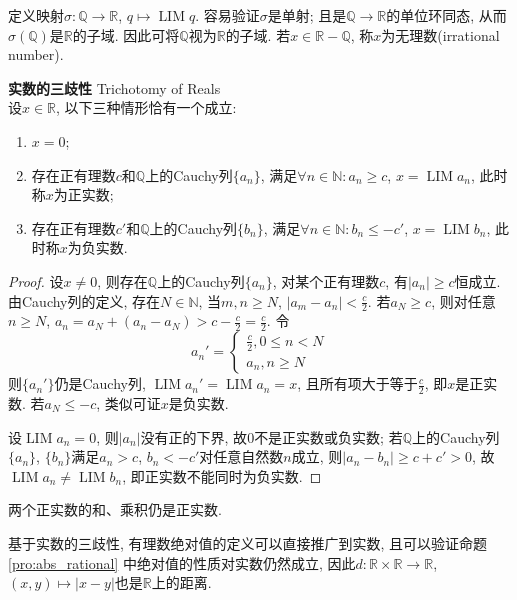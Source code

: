 \par 定义映射$\sigma: \mathbb{Q} \to \mathbb{R}$, $q\mapsto \operatorname{LIM}q$. 容易验证$\sigma$是单射; 且是$\mathbb{Q} \to \mathbb{R}$的单位环同态, 从而$\sigma(\mathbb{Q})$是$\mathbb{R}$的子域. 因此可将$\mathbb{Q}$视为$\mathbb{R}$的子域. 若$x\in \mathbb{R}-\mathbb{Q}$, 称$x$为无理数(irrational number). 

\begin{pro}\textbf{实数的三歧性} Trichotomy of Reals\\
设$x\in \mathbb{R}$, 以下三种情形恰有一个成立:
\begin{enumerate}
    \item $x=0$;
    \item 存在正有理数$c$和$\mathbb{Q}$上的Cauchy列$\{a_n\}$, 满足$\forall n\in \mathbb{N}: a_n\ge c$, $x=\operatorname{LIM} a_n$, 此时称$x$为正实数;
    \item 存在正有理数$c'$和$\mathbb{Q}$上的Cauchy列$\{b_n\}$, 满足$\forall n\in \mathbb{N}: b_n\le -c'$, $x=\operatorname{LIM} b_n$, 此时称$x$为负实数.
\end{enumerate}
\end{pro}
\begin{proof}
设$x\neq 0$, 则存在$\mathbb{Q}$上的Cauchy列$\{a_n\}$, 对某个正有理数$c$, 有$|a_n|\ge c$恒成立. 由Cauchy列的定义, 存在$N\in \mathbb{N}$, 当$m,n\ge N$, $|a_m-a_n|<\frac{c}{2}$. 若$a_N\ge c$, 则对任意$n\ge N$, $a_n = a_N +(a_n-a_N) > c - \frac{c}{2}=\frac{c}{2}$. 令
\begin{equation}
    a_n'=\begin{cases}
        \frac{c}{2}, 0\le n< N\\
        a_n, n\ge N
    \end{cases}
\end{equation}
则$\{a_n'\}$仍是Cauchy列, $\operatorname{LIM}a_n'=\operatorname{LIM}a_n=x$, 且所有项大于等于$\frac{c}{2}$, 即$x$是正实数. 若$a_N\le -c$, 类似可证$x$是负实数. 
\par 设$\operatorname{LIM}a_n = 0$, 则$|a_n|$没有正的下界, 故$0$不是正实数或负实数; 若$\mathbb{Q}$上的Cauchy列$\{a_n\}$, $\{b_n\}$满足$a_n>c$, $b_n<-c'$对任意自然数$n$成立, 则$|a_n-b_n|\ge c+c'>0$, 故$\operatorname{LIM} a_n \neq \operatorname{LIM} b_n$, 即正实数不能同时为负实数. 
\end{proof}
\par 两个正实数的和、乘积仍是正实数. 
\par 基于实数的三歧性, 有理数绝对值的定义可以直接推广到实数, 且可以验证命题\ref{pro:abs_rational} 中绝对值的性质对实数仍然成立, 因此$d:\mathbb{R}\times \mathbb{R}\to \mathbb{R}$, $(x,y)\mapsto |x-y|$也是$\mathbb{R}$上的距离. 

